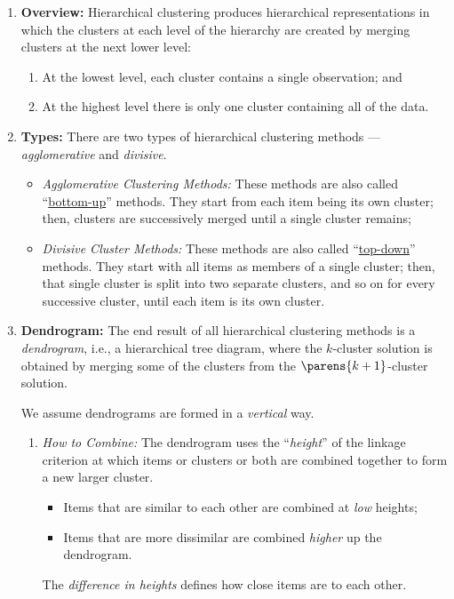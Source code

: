 \documentclass[12pt]{article}
\begin{document}
\begin{enumerate}[label=\textbf{\arabic*.}]

	\item \textbf{Overview:} Hierarchical clustering produces hierarchical representations in which the clusters at each level of the hierarchy are created by merging clusters at the next lower level: 
	\begin{enumerate}
		\item At the lowest level, each cluster contains a single observation; and 
		\item At the highest level there is only one cluster containing all of the data. 
	\end{enumerate}
	
	\item \textbf{Types:} There are two types of hierarchical clustering methods --- \textit{agglomerative} and \textit{divisive}. 
	\begin{itemize}
		\item \textit{Agglomerative Clustering Methods:} These methods are also called ``\underline{bottom-up}'' methods. They start from each item being its own cluster; then, clusters are successively merged until a single cluster remains; 
		\item \textit{Divisive Cluster Methods:} These methods are also called ``\underline{top-down}'' methods. They start with all items as members of a single cluster; then, that single cluster is split into two separate clusters, and so on for every successive cluster, until each item is its own cluster. 
	\end{itemize}
	
	\item \textbf{Dendrogram:} The end result of all hierarchical clustering methods is a \textit{dendrogram}, i.e., a hierarchical tree diagram, where the $k$-cluster solution is obtained by merging some of the clusters from the $\parens{k+1}$-cluster solution. 
	
	We assume dendrograms are formed in a \emph{vertical} way. 
	\begin{enumerate}
		\item \textit{How to Combine:} The dendrogram uses the ``\textit{height}'' of the linkage criterion at which items or clusters or both are combined together to form a new larger cluster. 
		\begin{itemize}
			\item Items that are similar to each other are combined at \emph{low} heights; 
			\item Items that are more dissimilar are combined \emph{higher} up the dendrogram. 
		\end{itemize}
		The \emph{difference in heights} defines how close items are to each other. 
		

\end{enumerate}
\end{enumerate}
\end{document}
